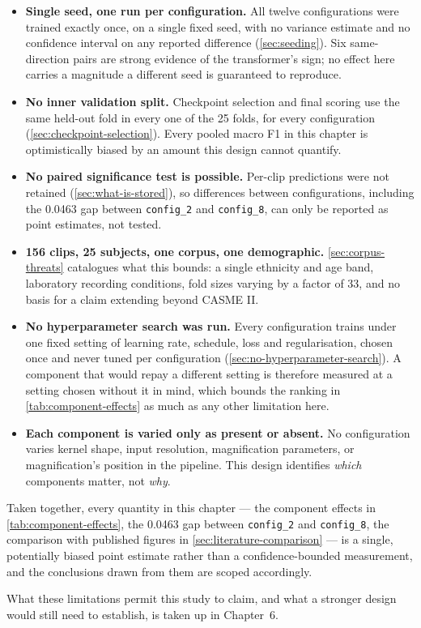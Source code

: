 \begin{itemize}
	\item \textbf{Single seed, one run per configuration.} All twelve configurations were trained exactly once, on a single fixed seed, with no variance estimate and no confidence interval on any reported difference (\autoref{sec:seeding}). Six same-direction pairs are strong evidence of the transformer's sign; no effect here carries a magnitude a different seed is guaranteed to reproduce.
	\item \textbf{No inner validation split.} Checkpoint selection and final scoring use the same held-out fold in every one of the 25 folds, for every configuration (\autoref{sec:checkpoint-selection}). Every pooled macro F1 in this chapter is optimistically biased by an amount this design cannot quantify.
	\item \textbf{No paired significance test is possible.} Per-clip predictions were not retained (\autoref{sec:what-is-stored}), so differences between configurations, including the 0.0463 gap between \texttt{config\_2} and \texttt{config\_8}, can only be reported as point estimates, not tested.
	\item \textbf{156 clips, 25 subjects, one corpus, one demographic.} \autoref{sec:corpus-threats} catalogues what this bounds: a single ethnicity and age band, laboratory recording conditions, fold sizes varying by a factor of 33, and no basis for a claim extending beyond CASME II.
	\item \textbf{No hyperparameter search was run.} Every configuration trains under one fixed setting of learning rate, schedule, loss and regularisation, chosen once and never tuned per configuration (\autoref{sec:no-hyperparameter-search}). A component that would repay a different setting is therefore measured at a setting chosen without it in mind, which bounds the ranking in \autoref{tab:component-effects} as much as any other limitation here.
	\item \textbf{Each component is varied only as present or absent.} No configuration varies kernel shape, input resolution, magnification parameters, or magnification's position in the pipeline. This design identifies \textit{which} components matter, not \textit{why}.
\end{itemize}

Taken together, every quantity in this chapter --- the component effects in \autoref{tab:component-effects}, the 0.0463 gap between \texttt{config\_2} and \texttt{config\_8}, the comparison with published figures in \autoref{sec:literature-comparison} --- is a single, potentially biased point estimate rather than a confidence-bounded measurement, and the conclusions drawn from them are scoped accordingly.

What these limitations permit this study to claim, and what a stronger design would still need to establish, is taken up in Chapter~6.
